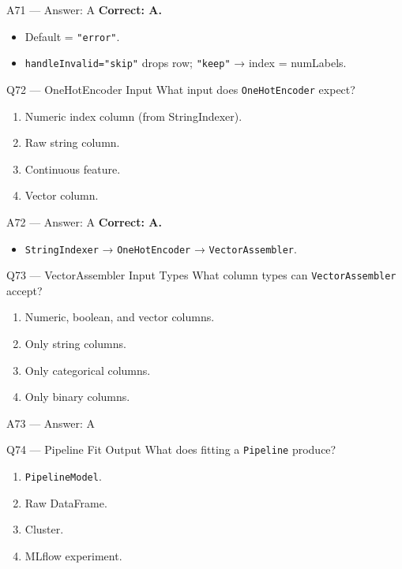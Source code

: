 \documentclass[aspectratio=169,10pt]{beamer}
\begin{document}
	\begin{frame}{A71 — Answer: A}
		\textbf{Correct: A.}
		\begin{itemize}
			\item Default = \texttt{"error"}.
			\item \texttt{handleInvalid="skip"} drops row; \texttt{"keep"} → index = numLabels.
		\end{itemize}
	\end{frame}
	
	\begin{frame}{Q72 — OneHotEncoder Input}
		What input does \texttt{OneHotEncoder} expect?
		\begin{enumerate}[label=\Alph*.]
			\item Numeric index column (from StringIndexer).
			\item Raw string column.
			\item Continuous feature.
			\item Vector column.
		\end{enumerate}
	\end{frame}
	
	\begin{frame}{A72 — Answer: A}
		\textbf{Correct: A.}
		\begin{itemize}
			\item \texttt{StringIndexer} → \texttt{OneHotEncoder} → \texttt{VectorAssembler}.
		\end{itemize}
	\end{frame}
	
	\begin{frame}{Q73 — VectorAssembler Input Types}
		What column types can \texttt{VectorAssembler} accept?
		\begin{enumerate}[label=\Alph*.]
			\item Numeric, boolean, and vector columns.
			\item Only string columns.
			\item Only categorical columns.
			\item Only binary columns.
		\end{enumerate}
	\end{frame}
	
	\begin{frame}{A73 — Answer: A}
	\end{frame}
	
	\begin{frame}{Q74 — Pipeline Fit Output}
		What does fitting a \texttt{Pipeline} produce?
		\begin{enumerate}[label=\Alph*.]
			\item \texttt{PipelineModel}.
			\item Raw DataFrame.
			\item Cluster.
			\item MLflow experiment.
		\end{enumerate}
	\end{frame}
	
\end{document}

